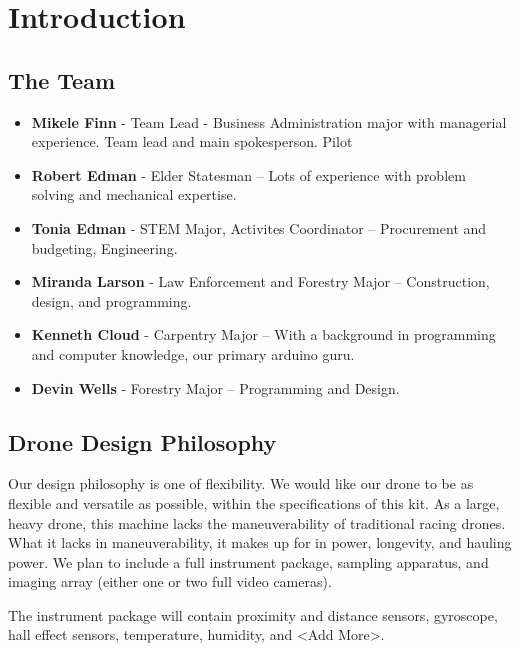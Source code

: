 
\section{Introduction}

\subsection{The Team}
\begin{itemize}
    \item \textbf{Mikele Finn} - Team Lead - Business Administration major with managerial experience. Team lead and main spokesperson. Pilot
    \item \textbf{Robert Edman} - Elder Statesman -- Lots of experience with problem solving and mechanical expertise.
    \item \textbf{Tonia Edman} - STEM Major, Activites Coordinator -- Procurement and budgeting, Engineering.
    \item \textbf{Miranda Larson} - Law Enforcement and Forestry Major -- Construction, design, and programming.
    \item \textbf{Kenneth Cloud} - Carpentry Major -- With a background in programming and computer knowledge, our primary arduino guru.
    \item \textbf{Devin Wells} - Forestry Major -- Programming and Design.
\end{itemize}


\subsection{Drone Design Philosophy}

Our design philosophy is one of flexibility. We would like our drone to be as flexible and versatile as possible, within the specifications of this kit. As a large, heavy drone, this machine lacks the maneuverability of traditional racing drones. What it lacks in maneuverability, it makes up for in power, longevity, and hauling power. We plan to include a full instrument package, sampling apparatus, and imaging array (either one or two full video cameras).

The instrument package will contain proximity and distance sensors, gyroscope, hall effect sensors, temperature, humidity, and <Add More>.

